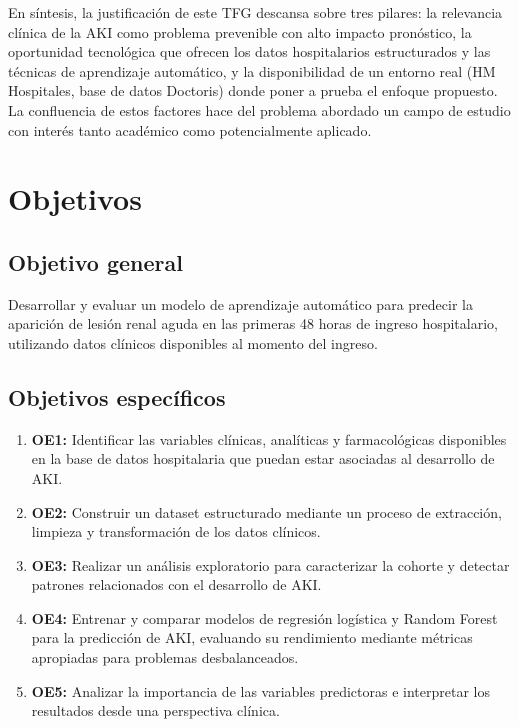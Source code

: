 \documentclass[12pt, a4paper, oneside]{report}
\begin{document}
En síntesis, la justificación de este TFG descansa sobre tres pilares: la relevancia clínica de la AKI como problema prevenible con alto impacto pronóstico, la oportunidad tecnológica que ofrecen los datos hospitalarios estructurados y las técnicas de aprendizaje automático, y la disponibilidad de un entorno real (HM Hospitales, base de datos Doctoris) donde poner a prueba el enfoque propuesto. La confluencia de estos factores hace del problema abordado un campo de estudio con interés tanto académico como potencialmente aplicado.

\chapter{Objetivos}
\label{chap:objetivos}

\section{Objetivo general}
\label{sec:obj_general}

Desarrollar y evaluar un modelo de aprendizaje automático para predecir la aparición de lesión renal aguda en las primeras 48 horas de ingreso hospitalario, utilizando datos clínicos disponibles al momento del ingreso.

\section{Objetivos específicos}
\label{sec:obj_especificos}

\begin{enumerate}
    \item \textbf{OE1:} Identificar las variables clínicas, analíticas y farmacológicas disponibles en la base de datos hospitalaria que puedan estar asociadas al desarrollo de AKI.
    \item \textbf{OE2:} Construir un dataset estructurado mediante un proceso de extracción, limpieza y transformación de los datos clínicos.
    \item \textbf{OE3:} Realizar un análisis exploratorio para caracterizar la cohorte y detectar patrones relacionados con el desarrollo de AKI.
    \item \textbf{OE4:} Entrenar y comparar modelos de regresión logística y Random Forest para la predicción de AKI, evaluando su rendimiento mediante métricas apropiadas para problemas desbalanceados.
    \item \textbf{OE5:} Analizar la importancia de las variables predictoras e interpretar los resultados desde una perspectiva clínica.
\end{enumerate}
\end{document}

